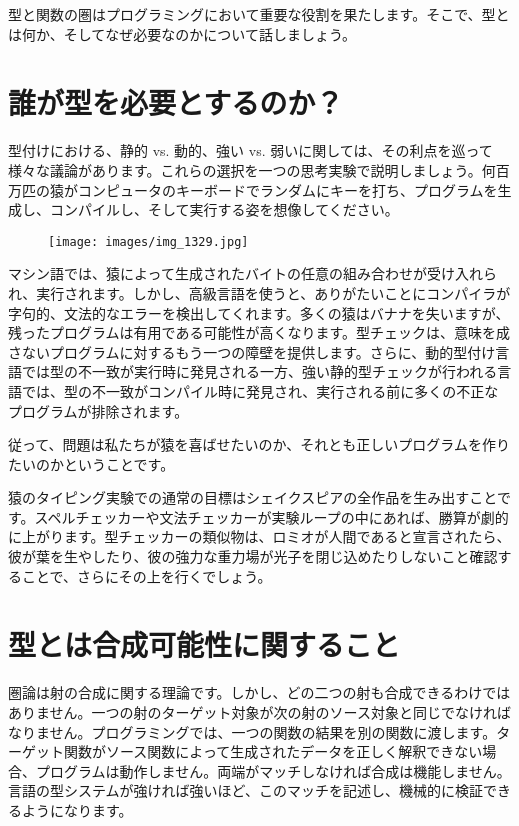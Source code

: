 
\lettrine[lhang=0.17]{型}{と関数}の圏はプログラミングにおいて重要な役割を果たします。そこで、型とは何か、そしてなぜ必要なのかについて話しましょう。

\section{誰が型を必要とするのか？}

型付けにおける、静的 vs. 動的、強い vs. 弱いに関しては、その利点を巡って様々な議論があります。これらの選択を一つの思考実験で説明しましょう。何百万匹の猿がコンピュータのキーボードでランダムにキーを打ち、プログラムを生成し、コンパイルし、そして実行する姿を想像してください。

\begin{figure}[H]
  \centering
  \texttt{[image: images/img\_1329.jpg]}
\end{figure}

\noindent
マシン語では、猿によって生成されたバイトの任意の組み合わせが受け入れられ、実行されます。しかし、高級言語を使うと、ありがたいことにコンパイラが字句的、文法的なエラーを検出してくれます。多くの猿はバナナを失いますが、残ったプログラムは有用である可能性が高くなります。型チェックは、意味を成さないプログラムに対するもう一つの障壁を提供します。さらに、動的型付け言語では型の不一致が実行時に発見される一方、強い静的型チェックが行われる言語では、型の不一致がコンパイル時に発見され、実行される前に多くの不正なプログラムが排除されます。

従って、問題は私たちが猿を喜ばせたいのか、それとも正しいプログラムを作りたいのかということです。

猿のタイピング実験での通常の目標はシェイクスピアの全作品を生み出すことです。スペルチェッカーや文法チェッカーが実験ループの中にあれば、勝算が劇的に上がります。型チェッカーの類似物は、ロミオが人間であると宣言されたら、彼が葉を生やしたり、彼の強力な重力場が光子を閉じ込めたりしないこと確認することで、さらにその上を行くでしょう。

\section{型とは合成可能性に関すること}

圏論は射の合成に関する理論です。しかし、どの二つの射も合成できるわけではありません。一つの射のターゲット対象が次の射のソース対象と同じでなければなりません。プログラミングでは、一つの関数の結果を別の関数に渡します。ターゲット関数がソース関数によって生成されたデータを正しく解釈できない場合、プログラムは動作しません。両端がマッチしなければ合成は機能しません。言語の型システムが強ければ強いほど、このマッチを記述し、機械的に検証できるようになります。


